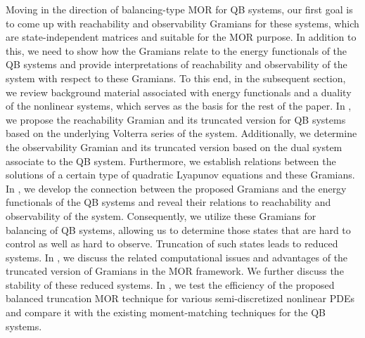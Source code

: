 Moving in the direction of balancing-type  MOR for QB systems, our first goal is to come up with reachability and observability Gramians for these systems, which are state-independent  matrices and suitable for the MOR purpose. In addition to this, we need to show  how the Gramians  relate to the energy functionals of the QB systems and provide interpretations of reachability and observability of the  system with respect to these Gramians. To this end, in the subsequent section, we review  background material  associated with energy functionals and a duality of the nonlinear systems, which  serves as the basis for the rest of the paper. In , we propose the  reachability Gramian  and its truncated version for QB systems based on the underlying Volterra series of the system. Additionally, we determine the observability Gramian and its truncated version based on the dual system associate to the QB system. Furthermore, we establish  relations between the solutions of a certain type of quadratic Lyapunov equations and these Gramians.  In ,  we develop the connection  between the proposed  Gramians  and the energy functionals of the QB systems and  reveal their relations to reachability and observability of the system. Consequently, we utilize these Gramians for balancing of QB systems, allowing us to determine those states that are hard to control as well as hard to observe. Truncation of such states leads to reduced systems.  In , we discuss the related computational issues and advantages of the truncated version of Gramians in the MOR framework. We further discuss the stability of these reduced systems.  In , we test the efficiency of the proposed balanced truncation MOR technique for various semi-discretized nonlinear PDEs and compare it with the existing moment-matching techniques for the QB systems.




